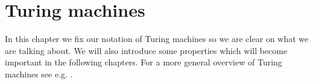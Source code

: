\section{Turing machines} \label{turing_machines}

In this chapter we fix our notation of Turing machines so we are clear on what we are talking about. We will also introduce some properties which will become important in the following chapters. For a more general overview of Turing machines see e.g. \cite{bbj07}.










